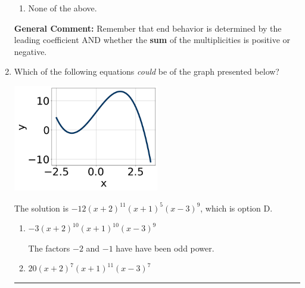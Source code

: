 \documentclass{extbook}[14pt]
\newcommand{\litem}[1]{\item #1

\rule{\textwidth}{0.4pt}}
\begin{document}
\begin{enumerate}
{\begin{enumerate}[label=\Alph*.]
\item None of the above.\end{enumerate}
\textbf{General Comment:} Remember that end behavior is determined by the leading coefficient AND whether the \textbf{sum} of the multiplicities is positive or negative.
}
\litem{
Which of the following equations \textit{could} be of the graph presented below?

\begin{center}
    \includegraphics[width=0.5\textwidth]{../Figures/polyGraphToFunctionCopyA.png}
\end{center}


The solution is \( -12(x + 2)^{11} (x + 1)^{5} (x - 3)^{9} \), which is option D.\begin{enumerate}[label=\Alph*.]
\item \( -3(x + 2)^{10} (x + 1)^{10} (x - 3)^{9} \)

The factors $-2$ and $-1$ have have been odd power.
\item \( 20(x + 2)^{7} (x + 1)^{11} (x - 3)^{7} \)


\end{enumerate}}
\end{enumerate}
\end{document}

